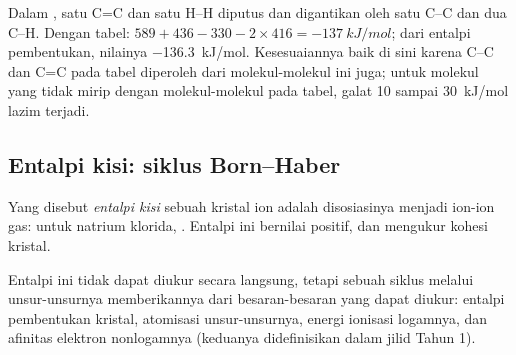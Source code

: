 \begin{example}\label{ex:b2:reaction-enthalpy:hydrogenation}
Dalam , satu C=C dan satu H--H diputus dan
digantikan oleh satu C--C dan dua C--H. Dengan tabel: $589 + 436 - 330 - 2
\times 416 = \qty{-137}{kJ/mol}$; dari entalpi pembentukan, nilainya
\qty{-136.3}{kJ/mol}. Kesesuaiannya baik di sini karena C--C dan C=C pada
tabel diperoleh dari molekul-molekul ini juga; untuk molekul yang tidak
mirip dengan molekul-molekul pada tabel, galat 10 sampai \qty{30}{kJ/mol}
lazim terjadi.
\end{example}

\subsection*{Entalpi kisi: siklus Born--Haber}

\begin{definition}\label{def:b2:reaction-enthalpy:lattice-enthalpy}
Yang disebut \emph{entalpi kisi} sebuah kristal ion
adalah  disosiasinya menjadi ion-ion gas: untuk
natrium klorida, . Entalpi ini bernilai
positif, dan mengukur kohesi kristal.
\end{definition}

Entalpi ini tidak dapat diukur secara langsung, tetapi sebuah siklus
melalui unsur-unsurnya memberikannya dari besaran-besaran yang dapat
diukur: entalpi pembentukan kristal, atomisasi unsur-unsurnya, energi
ionisasi logamnya, dan afinitas elektron nonlogamnya (keduanya
didefinisikan dalam jilid Tahun 1).

